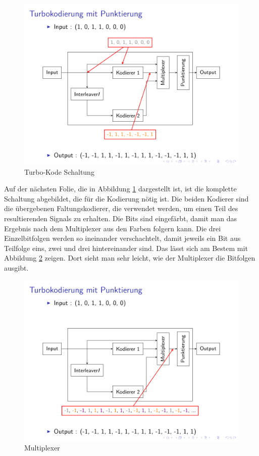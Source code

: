 \begin{figure}[!ht]
\centering
\includegraphics[width=\ScaleIfNeeded]{pictures/TurboEncodePunctured3}
\caption{Turbo-Kode Schaltung}
\label{pic:TurboEncode}
\end{figure}  

Auf der nächsten Folie, die in Abbildung \ref{pic:TurboEncode} dargestellt ist, ist die komplette Schaltung abgebildet, die für die Kodierung nötig ist. Die beiden Kodierer sind die übergebenen Faltungskodierer, die verwendet werden, um einen Teil des resultierenden Signals zu erhalten. Die Bits sind eingefärbt, damit man das Ergebnis nach dem Multiplexer aus den Farben folgern kann. Die drei Einzelbitfolgen werden so ineinander verschachtelt, damit jeweils ein Bit aus Teilfolge eins, zwei und drei hintereinander sind. Das lässt sich am Bestem mit Abbildung \ref{pic:TurboEncodeMultiplexer} zeigen. Dort sieht man sehr leicht, wie der Multiplexer die Bitfolgen ausgibt.

\begin{figure}[!ht]
\centering
\includegraphics[width=\ScaleIfNeeded]{pictures/TurboEncodePunctured4}
\caption{Multiplexer}
\label{pic:TurboEncodeMultiplexer}
\end{figure}  

